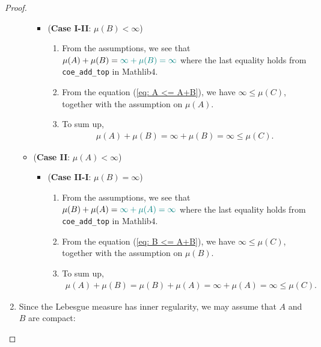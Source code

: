 \begin{proof}
\begin{enumerate}
\begin{itemize}
\begin{itemize}
                \item (\textbf{Case I-II}: \(\mu(B) < \infty\))
                \begin{enumerate}
                    \item From the assumptions, we see that \(\mu(A) + \mu(B) = {\color{teal}\infty + \mu(B) = \infty}\) where the last equality holds from \texttt{coe\_add\_top} in Mathlib4.
                    \item From the equation (\ref{eq: A <= A+B}), we have \(\infty \leq \mu(C)\), together with the assumption on \(\mu(A)\).
                    \item To sum up,
                    \begin{eqnarray*}
                        \mu(A) + \mu (B) = \infty + \mu(B) = \infty \leq \mu(C).
                    \end{eqnarray*}
                \end{enumerate}
            \end{itemize}
            \item (\textbf{Case II}: \(\mu(A) < \infty\))
            \begin{itemize}
                \item (\textbf{Case II-I}: \(\mu(B)=\infty\))
                \begin{enumerate}
                    \item From the assumptions, we see that \(\mu(B) + \mu(A) = {\color{teal}\infty + \mu(A) = \infty}\) where the last equality holds from \texttt{coe\_add\_top} in Mathlib4.
                    \item From the equation (\ref{eq: B <= A+B}), we have \(\infty \leq \mu(C)\), together with the assumption on \(\mu(B)\).
                    \item To sum up,
                    \begin{eqnarray*}
                        \mu(A) + \mu (B) = \mu(B) + \mu(A) = \infty + \mu(A) = \infty \leq \mu(C).
                    \end{eqnarray*}
                \end{enumerate}
            \end{itemize}
        \end{itemize}


        \item Since {\color{teal}the Lebesgue measure has inner regularity}, we may assume that \(A\) and \(B\) are compact:


\end{enumerate}
\end{proof}
